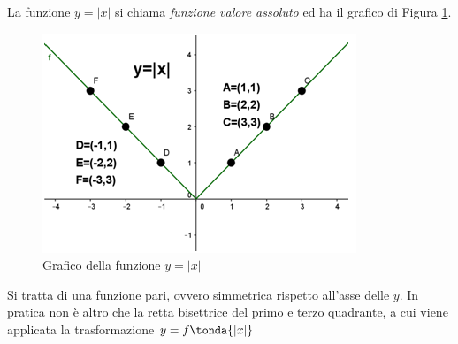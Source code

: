 La funzione \(y=|x|\) si chiama \emph{funzione valore assoluto} ed ha il grafico di Figura \ref{fig:abs_imm2}.
\begin{figure}[h]
\begin{center}
\begin{inaccessibleblock}[TODO]
\includegraphics[width=0.5\linewidth]{img/imm2} %
\caption{Grafico della funzione \(y = |x|\)}
\label{fig:abs_imm2}
\end{inaccessibleblock}
\end{center}
\end{figure}
Si tratta di una funzione pari, ovvero simmetrica rispetto all'asse delle \(y\). In pratica non è altro che
la retta bisettrice del primo e terzo quadrante, a cui viene applicata la trasformazione \(y = f\tonda{|x|}\)


